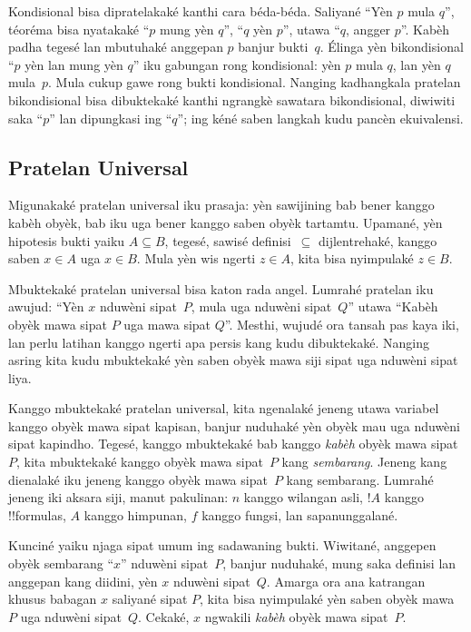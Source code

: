 \documentclass[../../../include/open-logic-section]{subfiles}
\begin{document}
Kondisional bisa dipratelakaké kanthi cara béda-béda. Saliyané
``Yèn $p$ mula $q$'', téoréma bisa nyatakaké ``$p$ mung yèn
$q$'', ``$q$ yèn $p$'', utawa ``$q$, angger $p$''.
Kabèh padha tegesé lan mbutuhaké anggepan $p$ banjur bukti~$q$.
Élinga yèn bikondisional ``$p$ yèn lan mung yèn $q$''
iku gabungan rong kondisional: yèn $p$ mula $q$, lan yèn $q$
mula~$p$. Mula cukup gawe rong bukti kondisional. Nanging
kadhangkala pratelan bikondisional bisa dibuktekaké kanthi ngrangkè
sawatara bikondisional, diwiwiti saka ``$p$'' lan dipungkasi
ing ``$q$''; ing kéné saben langkah kudu pancèn ekuivalensi.

\subsection{Pratelan Universal}

Migunakaké pratelan universal iku prasaja: yèn sawijining bab
bener kanggo kabèh obyèk, bab iku uga bener kanggo saben obyèk
tartamtu. Upamané, yèn hipotesis bukti yaiku $A \subseteq B$,
tegesé, sawisé definisi~$\subseteq$ dijlentrehaké, kanggo
saben $x \in A$ uga $x \in B$. Mula yèn wis ngerti $z \in A$,
kita bisa nyimpulaké $z \in B$.

Mbuktekaké pratelan universal bisa katon rada angel. Lumrahé
pratelan iku awujud: ``Yèn $x$ nduwèni sipat~$P$, mula uga
nduwèni sipat~$Q$'' utawa ``Kabèh obyèk mawa sipat $P$ uga mawa sipat $Q$''.
Mesthi, wujudé ora tansah pas kaya iki, lan perlu latihan
kanggo ngerti apa persis kang kudu dibuktekaké. Nanging asring
kita kudu mbuktekaké yèn saben obyèk mawa siji sipat uga
nduwèni sipat liya.

Kanggo mbuktekaké pratelan universal, kita ngenalaké jeneng
utawa variabel kanggo obyèk mawa sipat kapisan, banjur
nuduhaké yèn obyèk mau uga nduwèni sipat kapindho.
Tegesé, kanggo mbuktekaké bab kanggo \emph{kabèh} obyèk mawa sipat~$P$,
kita mbuktekaké kanggo obyèk mawa sipat~$P$ kang \emph{sembarang}.
Jeneng kang dienalaké iku jeneng kanggo obyèk mawa sipat~$P$ kang sembarang.
Lumrahé jeneng iki aksara siji, manut pakulinan: $n$
kanggo wilangan asli, $!A$ kanggo !!{formula}s, $A$
kanggo himpunan, $f$ kanggo fungsi, lan sapanunggalané.

Kunciné yaiku njaga sipat umum ing sadawaning bukti. Wiwitané,
anggepen obyèk sembarang ``$x$'' nduwèni sipat~$P$, banjur
nuduhaké, mung saka definisi lan anggepan kang diidini, yèn
$x$ nduwèni sipat~$Q$. Amarga ora ana katrangan khusus babagan
$x$ saliyané sipat $P$, kita bisa nyimpulaké yèn saben obyèk
mawa $P$ uga nduwèni sipat~$Q$. Cekaké, $x$ ngwakili
\emph{kabèh} obyèk mawa sipat~$P$.
\end{document}
